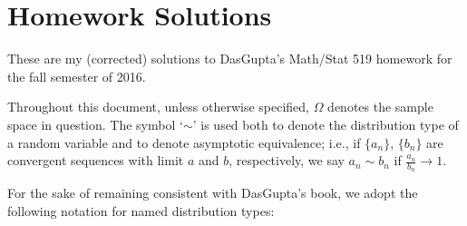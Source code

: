 \section{Homework Solutions}
These are my (corrected) solutions to DasGupta's Math/Stat 519 homework for
the fall semester of 2016.

Throughout this document, unless otherwise specified, \(\Omega\) denotes
the sample space in question. The symbol `\(\sim\)' is used both to denote
the distribution type of a random variable and to denote asymptotic
equivalence; i.e., if \(\{a_n\}\), \(\{b_n\}\) are convergent sequences
with limit \(a\) and \(b\), respectively, we say \(a_n\sim b_n\) if
\(\frac{a_n}{b_n}\to 1\).

For the sake of remaining consistent with DasGupta's book, we adopt the
following notation for named distribution types:
